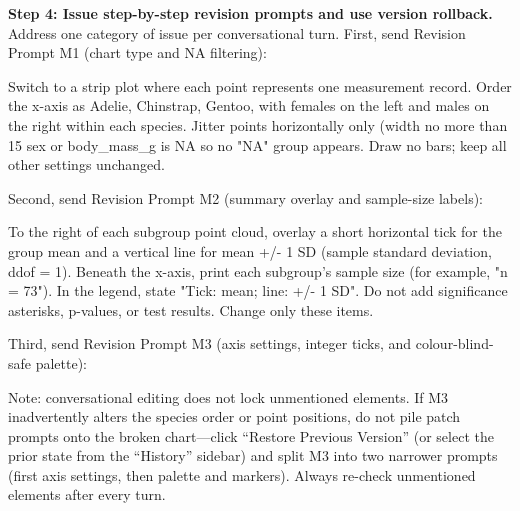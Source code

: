 \textbf{Step 4: Issue step-by-step revision prompts and use version rollback.} Address one category of issue per conversational turn. First, send Revision Prompt M1 (chart type and NA filtering):

\begin{Prompt}
Switch to a strip plot where each point represents one measurement record. Order
the x-axis as Adelie, Chinstrap, Gentoo, with females on the left and males on
the right within each species. Jitter points horizontally only (width no more
than 15%
sex or body_mass_g is NA so no "NA" group appears. Draw no bars; keep all other
settings unchanged.
\end{Prompt}

Second, send Revision Prompt M2 (summary overlay and sample-size labels):

\begin{Prompt}
To the right of each subgroup point cloud, overlay a short horizontal tick for
the group mean and a vertical line for mean +/- 1 SD (sample standard deviation,
ddof = 1). Beneath the x-axis, print each subgroup's sample size (for example,
"n = 73"). In the legend, state "Tick: mean; line: +/- 1 SD". Do not add
significance asterisks, p-values, or test results. Change only these items.
\end{Prompt}

Third, send Revision Prompt M3 (axis settings, integer ticks, and colour-blind-safe palette):


Note: conversational editing does not lock unmentioned elements. If M3 inadvertently alters the species order or point positions, do not pile patch prompts onto the broken chart—click ``Restore Previous Version'' (or select the prior state from the ``History'' sidebar) and split M3 into two narrower prompts (first axis settings, then palette and markers). Always re-check unmentioned elements after every turn.

